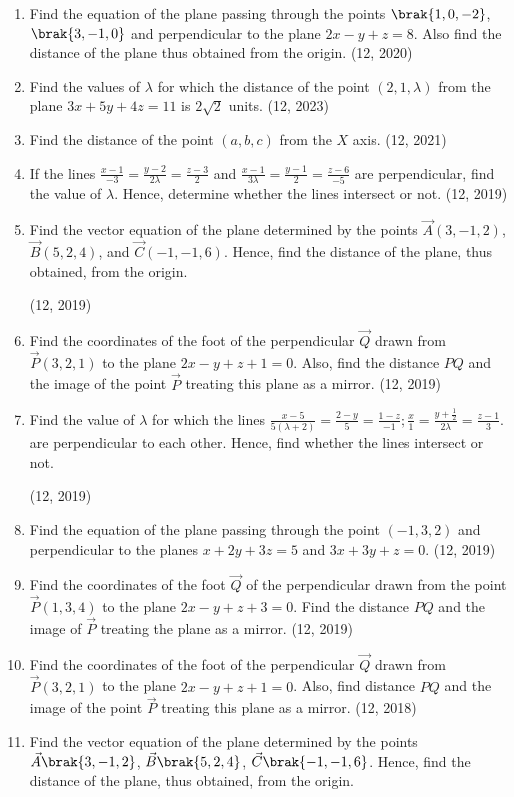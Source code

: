 \begin{enumerate}[label=\thesubsection.\arabic*, ref=\thesubsection.\theenumi]
\item Find the equation of the plane passing through the points $\brak{1, 0, -2}$,  $\brak{3, -1, 0}$ and perpendicular to the plane $2x - y + z = 8$. Also find the distance of the plane thus obtained from the origin.
\hfill (12, 2020)
    \item Find the values of $\lambda$ for which the distance of the point $(2, 1, \lambda)$ from the plane
$        3x + 5y + 4z = 11$
    is $2\sqrt{2}$ units.
    \hfill (12, 2023)
	\item Find the distance of the point $(a, b, c)$ from the $X$ axis. \hfill (12, 2021)
	\item If the lines $\frac{x-1}{-3} = \frac{y-2}{2\lambda} = \frac{z-3}{2}$ and $\frac{x-1}{3\lambda} = \frac{y-1}{2} = \frac{z-6}{-5}$ are perpendicular, find the value of $\lambda$. Hence, determine whether the lines intersect or not.
		\hfill (12, 2019)
	\item Find the vector equation of the plane determined by the points $\vec{A}(3, -1, 2)$, $\vec{B}(5, 2, 4)$, and $\vec{C}(-1, -1, 6)$. Hence, find the distance of the plane, thus obtained, from the origin.

		\hfill (12, 2019)
	\item Find the coordinates of the foot of the perpendicular $\vec{Q}$ drawn from $\vec{P}(3, 2, 1)$ to the plane $2x - y + z + 1 = 0$. Also, find the distance $PQ$ and the image of the point $\vec{P}$ treating this plane as a mirror. \hfill (12, 2019)
	\item Find the value of $\lambda$ for which the lines $\frac{x-5}{5(\lambda+2)} = \frac{2-y}{5} = \frac{1-z}{-1}; \frac{x}{1} = \frac{y + \frac{1}{2}}{2\lambda} = \frac{z-1}{3}.$ are perpendicular to each other.
	Hence, find whether the lines intersect or not.

		\hfill (12, 2019)
	\item Find the equation of the plane passing through the point $(-1, 3, 2)$ and perpendicular to the planes $x + 2y + 3z = 5$ and $3x + 3y + z = 0$. \hfill (12, 2019)
	
	\item Find the coordinates of the foot $\vec{Q}$ of the perpendicular drawn from the point $\vec{P}(1, 3, 4)$ to the plane $2x - y + z + 3 = 0$. Find the distance $PQ$ and the image of $\vec{P}$ treating the plane as a mirror. \hfill (12, 2019)
\item Find the coordinates of the foot of the perpendicular $\vec{Q}$ drawn from $\vec{P}(3, 2, 1)$ to the plane $2x - y + z + 1 = 0$. Also, find distance $PQ$ and the image of the point $\vec{P}$ treating this plane as a mirror.
\hfill (12, 2018)
\item Find the vector equation of the plane determined by the points $\vec{A}\brak{3,-1,2}$, $\vec{B}\brak{5,2,4}$, $\vec{C}\brak{-1,-1,6}$. Hence, find the distance of the plane, thus obtained, from the origin.


\end{enumerate}
